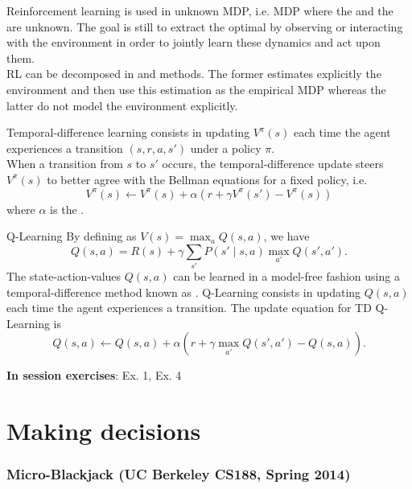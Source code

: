 \documentclass[11pt, a4paper]{article}
\begin{document}
\begin{thbox}{Reinforcement learning}
     is used in unknown MDP, i.e. MDP where the  and the  are unknown. The goal is still to extract the optimal  by observing or interacting with the environment in order to jointly learn these dynamics and act upon them.\\
    RL can be decomposed in  and  methods. The former estimates explicitly the environment and then use this estimation as the empirical MDP whereas the latter do not model the environment explicitly.
\end{thbox}

\begin{thbox}{Temporal-difference learning}
     consists in updating $V^\pi(s)$ each time the agent experiences a transition $(s,r,a,s')$ under a policy $\pi$.\\
    When a transition from $s$ to $s'$ occurs, the temporal-difference update steers $V^\pi(s)$ to better agree with the Bellman equations for a fixed policy, i.e.
    $$
    V^\pi(s) \leftarrow V^\pi(s) + \alpha(r + \gamma V^\pi(s') - V^\pi(s))
    $$
    where $\alpha$ is the .
\end{thbox}

\begin{thbox}{Q-Learning}
    By defining  as $V(s) = \max_a Q(s,a)$, we have
    $$
    Q(s,a) = R(s) + \gamma \sum_{s'} P(s'\mid s,a) \max_{a'}Q(s',a').
    $$
    The state-action-values $Q(s,a)$ can be learned in a model-free fashion using a temporal-difference method known as . Q-Learning consists in updating $Q(s,a)$ each time the agent experiences a transition. The update equation for TD Q-Learning is
    $$
    Q(s,a) \leftarrow Q(s,a) + \alpha(r + \gamma \max_{a'}Q(s',a') - Q(s,a)).
    $$   
\end{thbox}
\textbf{In session exercises}: Ex. 1, Ex. 4
\newpage

\part{Making decisions}

\section{Micro-Blackjack (UC Berkeley CS188, Spring 2014)}
\end{document}
